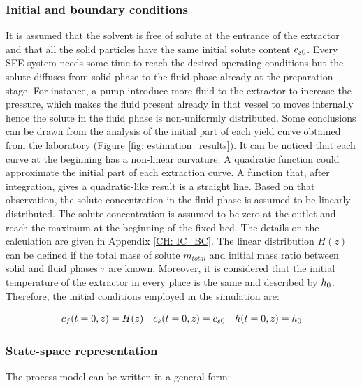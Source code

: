 \documentclass[../Article_Model_Parameters.tex]{subfiles}
\begin{document}
		\subsubsection{Initial and boundary conditions} 
		It is assumed that the solvent is free of solute at the entrance of the extractor and that all the solid particles have the same initial solute content ${\color{black}c_{s0}}$. Every SFE system needs some time to reach the desired operating conditions but the solute diffuses from solid phase to the fluid phase already at the preparation stage. For instance, a pump introduce more fluid to the extractor to increase the pressure, which makes the fluid present already in that vessel to moves internally hence the solute in the fluid phase is non-uniformly distributed. Some conclusions can be drawn from the analysis of the initial part of each yield curve obtained from the laboratory (Figure \ref{fig: estimation_results}). It can be noticed that each curve at the beginning has a non-linear curvature. A quadratic function could approximate the initial part of each extraction curve. A function that, after integration, gives a quadratic-like result is a straight line. Based on that observation, the solute concentration in the fluid phase is assumed to be linearly distributed. The solute concentration is assumed to be zero at the outlet and reach the maximum at the beginning of the fixed bed. The details on the calculation are given in Appendix \ref{CH: IC_BC}. The linear distribution $H(z)$ can be defined if the total mass of solute $m_{total}$ and initial mass ratio between solid and fluid phases $\tau$ are known.
		Moreover, it is considered that the initial temperature of the extractor in every place is the same and described by ${\color{black}h_0}$. Therefore, the initial conditions employed in the simulation are:
			
		{\footnotesize
				\begin{equation*}
					{\color{black}c_f}(t = 0, z) = H(z) \quad {\color{black}c_s}(t = 0, z) = {\color{black}c_{s0}} \quad {\color{black}h}(t = 0, z) = {\color{black}h_0}
				\end{equation*} }
	
		\subsubsection{State-space representation} \label{CH: State_space}
			
		The process model can be written in a general form:
			
\end{document}
